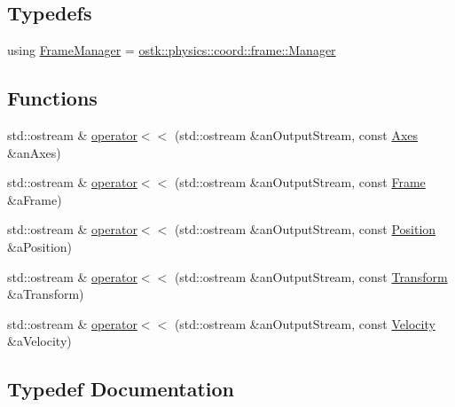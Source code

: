 \subsection*{Typedefs}
\begin{DoxyCompactItemize}
\item 
using \hyperlink{namespaceostk_1_1physics_1_1coord_ab147ada31124a59de8f25da43781195b}{Frame\+Manager} = \hyperlink{classostk_1_1physics_1_1coord_1_1frame_1_1_manager}{ostk\+::physics\+::coord\+::frame\+::\+Manager}
\end{DoxyCompactItemize}
\subsection*{Functions}
\begin{DoxyCompactItemize}
\item 
std\+::ostream \& \hyperlink{namespaceostk_1_1physics_1_1coord_ae664540b70d257ba9392b7697e6deffa}{operator$<$$<$} (std\+::ostream \&an\+Output\+Stream, const \hyperlink{classostk_1_1physics_1_1coord_1_1_axes}{Axes} \&an\+Axes)
\item 
std\+::ostream \& \hyperlink{namespaceostk_1_1physics_1_1coord_aeeb51929f47088ef63f55f68d4aab975}{operator$<$$<$} (std\+::ostream \&an\+Output\+Stream, const \hyperlink{classostk_1_1physics_1_1coord_1_1_frame}{Frame} \&a\+Frame)
\item 
std\+::ostream \& \hyperlink{namespaceostk_1_1physics_1_1coord_a918d51d18aec0b972f953dea66f9a2c6}{operator$<$$<$} (std\+::ostream \&an\+Output\+Stream, const \hyperlink{classostk_1_1physics_1_1coord_1_1_position}{Position} \&a\+Position)
\item 
std\+::ostream \& \hyperlink{namespaceostk_1_1physics_1_1coord_a8454223a479e438f9a17a5bb01e552cc}{operator$<$$<$} (std\+::ostream \&an\+Output\+Stream, const \hyperlink{classostk_1_1physics_1_1coord_1_1_transform}{Transform} \&a\+Transform)
\item 
std\+::ostream \& \hyperlink{namespaceostk_1_1physics_1_1coord_ae9f09f080ab2c16e20579dbd585aaadc}{operator$<$$<$} (std\+::ostream \&an\+Output\+Stream, const \hyperlink{classostk_1_1physics_1_1coord_1_1_velocity}{Velocity} \&a\+Velocity)
\end{DoxyCompactItemize}


\subsection{Typedef Documentation}
\mbox{\label{namespaceostk_1_1physics_1_1coord_ab147ada31124a59de8f25da43781195b}} 
